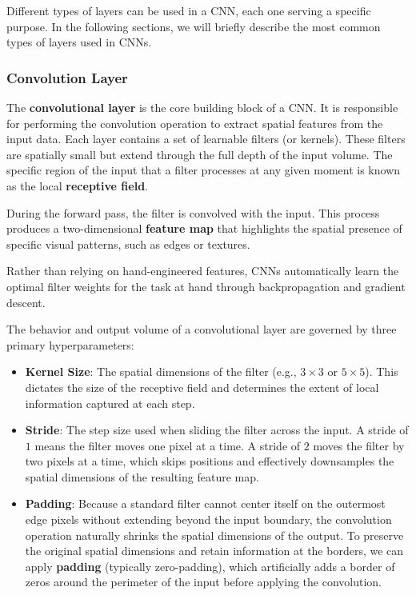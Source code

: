 Different types of layers can be used in a CNN, each one serving a specific purpose. In the following sections, we will briefly describe the most common types of layers used in CNNs.

\subsubsection{Convolution Layer}
The \textbf{convolutional layer} is the core building block of a CNN.
It is responsible for performing the convolution operation to extract spatial features from the input data. 
Each layer contains a set of learnable filters (or kernels). These filters are spatially small but extend through the full depth of the input volume. 
The specific region of the input that a filter processes at any given moment is known as the local \textbf{receptive field}.

During the forward pass, the filter is convolved with the input. This process produces a two-dimensional \textbf{feature map} 
that highlights the spatial presence of specific visual patterns, such as edges or textures.

Rather than relying on hand-engineered features, CNNs automatically learn the optimal filter weights for the task at hand through backpropagation and gradient descent.

The behavior and output volume of a convolutional layer are governed by three primary hyperparameters:
\begin{itemize}
    \item \textbf{Kernel Size}: The spatial dimensions of the filter (e.g., $3 \times 3$ or $5 \times 5$). This dictates the size of the receptive field and determines the extent of local information captured at each step.
    \item \textbf{Stride}: The step size used when sliding the filter across the input. A stride of $1$ means the filter moves one pixel at a time. A stride of $2$ moves the filter by two pixels at a time, which skips positions and effectively downsamples the spatial dimensions of the resulting feature map.
    \item \textbf{Padding}: Because a standard filter cannot center itself on the outermost edge pixels without extending beyond the input boundary, the convolution operation naturally shrinks the spatial dimensions of the output. To preserve the original spatial dimensions and retain information at the borders, we can apply \textbf{padding} (typically zero-padding), which artificially adds a border of zeros around the perimeter of the input before applying the convolution.
\end{itemize}

